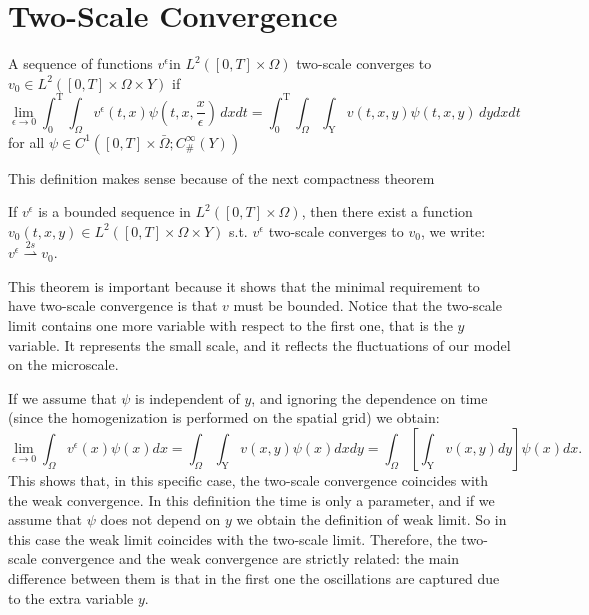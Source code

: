 \section{Two-Scale Convergence}

\begin{definition}
A sequence of functions $ v ^ {\epsilon } $in $ L^2([ 0 ,T]\times\Omega) $ two-scale converges to $v_{0} \in L^2([ 0 ,T]\times\Omega \times Y)$ if
$$
\lim_{\epsilon \to 0} \int_{0}^{\textrm{T}} \int_{\Omega} v^{\epsilon}(t,x)\psi\left(t,x,\frac{x}{\epsilon}\right) \, dxdt=\int_{0}^{\textrm{T}} \int_{\Omega} \int_{\textrm{Y}} v(t,x,y)\psi(t,x,y) \, dydxdt
$$ 
for all $\psi \in C^1([0,T]\times \bar\Omega;C_{\#}^{\infty}(Y))$
\label{def 7.1}\end{definition}
This definition makes sense because of the next compactness theorem 
\begin{theorem}
If $v^{\epsilon}$ is a bounded sequence in $ L^2([ 0 ,T]\times\Omega) $, then there exist a function $v_{0}(t,x,y) \in   L^2([0,T]\times\Omega \times Y)$ s.t. $v^{\epsilon}$ two-scale converges to $v_{0}$, we write: 
$v^{\epsilon} \overset{2s}{\rightharpoonup} v_{0}$.
\label{thm 7.1}\end{theorem}
This theorem is important because it shows that the minimal requirement to have two-scale convergence is that $v$ must be bounded. Notice that the two-scale limit contains one more variable with respect to the first one, that is the $y$ variable. It represents the small scale, and it reflects the fluctuations of our model on the microscale.
\begin{remark} If we assume that $\psi$ is independent of $y$, and ignoring the dependence on time (since the homogenization is performed on the spatial grid) we obtain:
$$ 
\lim_{\epsilon \to 0} \int_{\Omega} v^{\epsilon}(x)\psi(x)dx= \int_{\Omega} \int_{\textrm{Y}} v(x,y)\psi(x)dxdy=\int_{\Omega} \left[\int_{\textrm{Y}} v(x,y)dy\right]\psi(x)dx.
$$This shows that, in this specific case, the two-scale convergence coincides with the weak convergence.
In this definition the time is only a parameter, and if we assume that $\psi$ does not depend on $y$ we obtain the definition of weak limit. So in this case the weak limit coincides with the two-scale limit. Therefore, the two-scale convergence and the weak convergence are strictly related: the main difference between them is that in the first one the oscillations are captured due to the extra variable $y$.
\end{remark}
